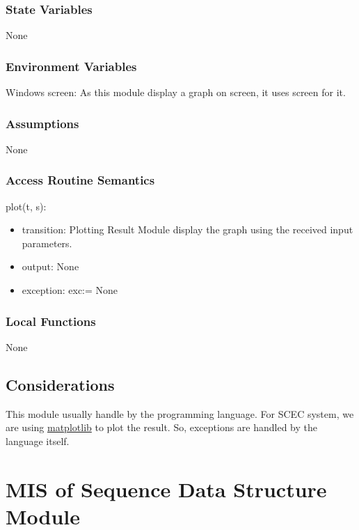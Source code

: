 \documentclass[12pt, titlepage]{article}
\begin{document}
\subsubsection{State Variables}

None

\subsubsection{Environment Variables}

Windows screen: As this module display a graph on screen, it uses screen for it. 

\subsubsection{Assumptions}

None

\subsubsection{Access Routine Semantics}

\noindent plot(t, s):
\begin{itemize}
\item transition: Plotting Result Module display the graph using the received input parameters.
\item output: None
\item exception: exc:= 
None
\end{itemize}


\subsubsection{Local Functions}

None

\subsection{Considerations}

This module usually handle by the programming language. For SCEC system, we are using \href{https://matplotlib.org/stable/tutorials/introductory/pyplot.html}{matplotlib} to plot the result. So, exceptions are handled by the language itself. 

\newpage
\section{MIS of Sequence Data Structure Module} \label{Sequence_Data_Structure_Module} 
 
\end{document}
